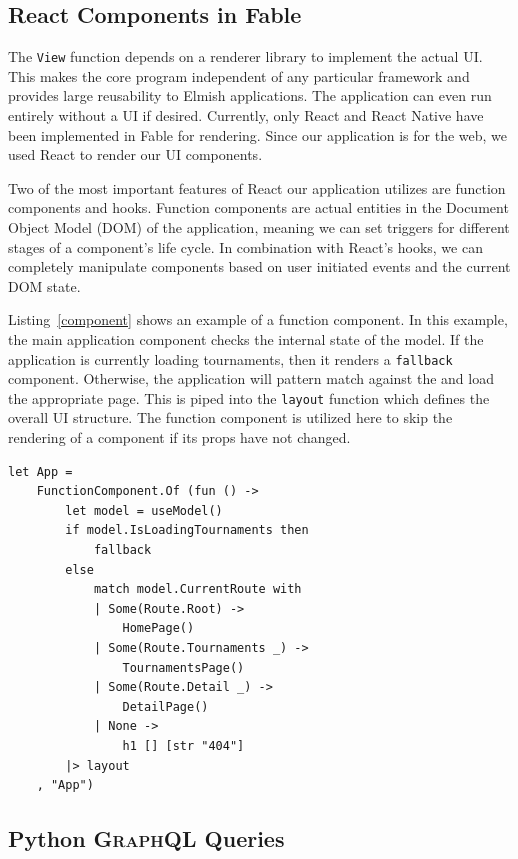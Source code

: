 \documentclass[sigconf]{acmart}
\begin{document}
\subsection{React Components in Fable}

The \texttt{View} function depends on a renderer library to implement the actual \textsc{UI}. This makes the core program independent of any particular framework and provides large reusability to Elmish applications. The application can even run entirely without a \textsc{UI} if desired. Currently, only React and React Native have been implemented in Fable for rendering. Since our application is for the web, we used React to render our \textsc{UI} components.

Two of the most important features of React our application utilizes are function components and hooks. Function components are actual entities in the Document Object Model (DOM) of the application, meaning we can set triggers for different stages of a component's life cycle. In combination with React's hooks, we can completely manipulate components based on user initiated events and the current DOM state. 

Listing~\ref{component} shows an example of a function component. In this example, the main application component checks the internal state of the model. If the application is currently loading tournaments, then it renders a \texttt{fallback} component. Otherwise, the application will pattern match against the  and load the appropriate page. This is piped into the \texttt{layout} function which defines the overall \textsc{UI} structure. The function component is utilized here to skip the rendering of a component if its props have not changed.

\begin{lstlisting}[language=F#, caption=Function component example., label=component]
let App =
    FunctionComponent.Of (fun () ->
        let model = useModel()
        if model.IsLoadingTournaments then
            fallback
        else
            match model.CurrentRoute with
            | Some(Route.Root) ->
                HomePage()
            | Some(Route.Tournaments _) ->
                TournamentsPage()
            | Some(Route.Detail _) ->
                DetailPage()
            | None ->
                h1 [] [str "404"]
        |> layout
    , "App")
\end{lstlisting}

\subsection{Python \textsc{GraphQL} Queries}
\end{document}
